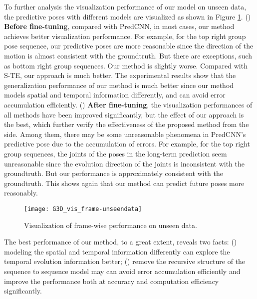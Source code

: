 \documentclass[journal]{IEEEtran}
\begin{document}
To further analysis the visualization performance of our model on unseen data, the predictive poses with different models are visualized as shown in Figure \ref{fig15}. () {\bf Before fine-tuning}, compared with PredCNN, in most cases, our method achieves better visualization performance. For example, for the top right group pose sequence, our predictive poses are more reasonable since the direction of the motion is almost consistent with the groundtruth. But there are exceptions, such as bottom right group sequences. Our method is slightly worse. Compared with S-TE, our approach is much better. The experimental results show that the generalization performance of our method is much better since our method models spatial and temporal information differently, and can avoid error accumulation efficiently. () {\bf After fine-tuning}, the visualization performances of all methods have been improved significantly, but the effect of our approach is the best, which further verify the effectiveness of the proposed method from the side. Among them, there may be some unreasonable phenomena in PredCNN's predictive pose due to the accumulation of errors. For example, for the top right group sequences, the joints of the poses in the long-term prediction seem unreasonable since the evolution direction of the joints is inconsistent with the groundtruth. But our performance is approximately consistent with the groundtruth. This shows again that our method can predict future poses more reasonably.

\begin{figure}[!t]
\centering
\texttt{[image: G3D\_vis\_frame-unseendata]}
\caption{Visualization of frame-wise performance on unseen data.}
\label{fig15}
\end{figure}

The best performance of our method, to a great extent, reveals two facts: () modeling the spatial and temporal information differently can explore the temporal evolution information better; () remove the recursive structure of the sequence to sequence model may can avoid error accumulation efficiently and improve the performance both at accuracy and computation efficiency significantly.
\end{document}
